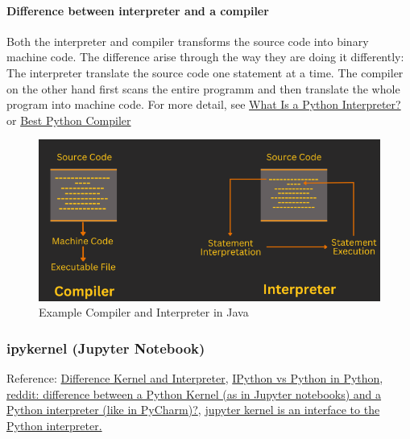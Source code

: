 \paragraph{Difference between interpreter and a compiler}
Both the interpreter and compiler transforms the source code into binary machine code.
The difference arise through the way they are doing it differently: The interpreter translate the source code one statement at a time. The compiler on the other hand first scans the entire programm and then translate the whole program into machine code. For more detail, see \href{https://blog.hubspot.com/website/what-is-python-interpreter#:~:text=A%20python%20interpreter%20is%20a,and%20low%2Dlevel%20languages%20are.}{What Is a Python Interpreter?} or \href{https://www.analyticsvidhya.com/blog/2021/05/choose-best-python-compilers-for-your-machine-learning-project-detailed-overview/#:~:text=What%20is%20a%20Python%20compiler,executed%20directly%20by%20a%20computer.}{Best Python Compiler}
\begin{figure}[H]
	\centering
	\includegraphics[scale = 0.3]{attachment/chapter_AML/Scc004}
	\caption{Example Compiler and Interpreter in Java}
\end{figure}

\subsubsection{ipykernel (Jupyter Notebook)}
Reference: \href{https://www.reddit.com/r/learnprogramming/comments/imhxai/what_is_the_difference_between_a_python_kernel_as/#:~:text=Python%20kernel%20is%20just%20a,is%20also%20not%20an%20interpreter.}{Difference Kernel and Interpreter}, \href{https://plotly.com/python/ipython-vs-python/}{IPython vs Python in Python}, \href{https://www.reddit.com/r/learnprogramming/comments/imhxai/what_is_the_difference_between_a_python_kernel_as/#:~:text=Python%20kernel%20is%20just%20a,is%20also%20not%20an%20interpreter.}{reddit:  difference between a Python Kernel (as in Jupyter notebooks) and a Python interpreter (like in PyCharm)?}, \href{https://python-forum.io/thread-40721.html}{jupyter kernel is an interface to the Python interpreter.} 


